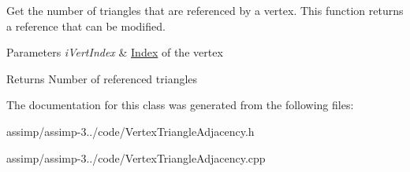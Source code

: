 Get the number of triangles that are referenced by a vertex. This function returns a reference that can be modified. 


\begin{DoxyParams}{Parameters}
{\em i\+Vert\+Index} & \hyperlink{struct_index}{Index} of the vertex \\
\hline
\end{DoxyParams}
\begin{DoxyReturn}{Returns}
Number of referenced triangles 
\end{DoxyReturn}


The documentation for this class was generated from the following files\+:\begin{DoxyCompactItemize}
\item 
assimp/assimp-\/3../code/Vertex\+Triangle\+Adjacency.\+h\item 
assimp/assimp-\/3../code/Vertex\+Triangle\+Adjacency.\+cpp\end{DoxyCompactItemize}
